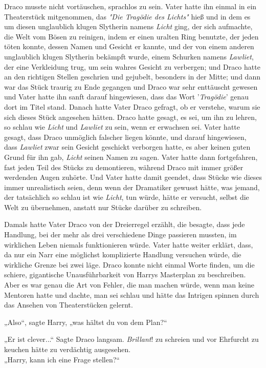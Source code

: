 {Draco musste nicht vortäuschen, sprachlos zu sein. Vater hatte ihn einmal in ein Theaterstück mitgenommen, das \emph{"Die Tragödie des Lichts"} hieß und in dem es um diesen unglaublich klugen Slytherin namens \emph{Licht} ging, der sich aufmachte, die Welt vom Bösen zu reinigen, indem er einen uralten Ring benutzte, der jeden töten konnte, dessen Namen und Gesicht er kannte, und der von einem anderen unglaublich klugen Slytherin bekämpft wurde, einem Schurken namens \emph{Lawliet}, der eine Verkleidung trug, um sein wahres Gesicht zu verbergen; und Draco hatte an den richtigen Stellen geschrien und gejubelt, besonders in der Mitte; und dann war das Stück traurig zu Ende gegangen und Draco war sehr enttäuscht gewesen und Vater hatte ihn sanft darauf hingewiesen, dass das Wort '\emph{Tragödie}' genau dort im Titel stand. Danach hatte Vater Draco gefragt, ob er verstehe, warum sie sich dieses Stück angesehen hätten. Draco hatte gesagt, es sei, um ihn zu lehren, so schlau wie \emph{Licht} und \emph{Lawliet} zu sein, wenn er erwachsen sei. Vater hatte gesagt, dass Draco unmöglich falscher liegen könnte, und darauf hingewiesen, dass \emph{Lawliet} zwar sein Gesicht geschickt verborgen hatte, es aber keinen guten Grund für ihn gab, \emph{Licht} seinen Namen zu sagen. Vater hatte dann fortgefahren, fast jeden Teil des Stücks zu demontieren, während Draco mit immer größer werdenden Augen zuhörte. Und Vater hatte damit geendet, dass Stücke wie dieses immer unrealistisch seien, denn wenn der Dramatiker gewusst hätte, was jemand, der tatsächlich so schlau ist wie \emph{Licht}, tun würde, hätte er versucht, selbst die Welt zu übernehmen, anstatt nur Stücke darüber zu schreiben.

Damals hatte Vater Draco von der Dreierregel erzählt, die besagte, dass jede Handlung, bei der mehr als drei verschiedene Dinge passieren mussten, im wirklichen Leben niemals funktionieren würde. Vater hatte weiter erklärt, dass, da nur ein Narr eine möglichst komplizierte Handlung versuchen würde, die wirkliche Grenze bei zwei läge. Draco konnte nicht einmal Worte finden, um die schiere, gigantische Unausführbarkeit von Harrys Masterplan zu beschreiben. Aber es war genau die Art von Fehler, die man machen würde, wenn man keine Mentoren hatte und dachte, man sei schlau und hätte das Intrigen spinnen durch das Ansehen von Theaterstücken gelernt.

„Also“, sagte Harry, „was hältst du von dem Plan?“

„Er ist clever...“ Sagte Draco langsam. \emph{Brillant}! zu schreien und vor Ehrfurcht zu keuchen hätte zu verdächtig ausgesehen.\\ „Harry, kann ich eine Frage stellen?“

}
